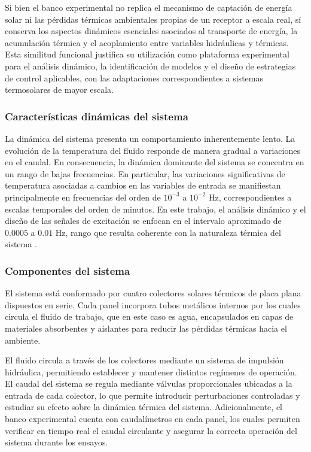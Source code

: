 \documentclass[11pt]{report}
\begin{document}
Si bien el banco experimental no replica el mecanismo de captación de energía solar ni las pérdidas térmicas ambientales propias de un receptor a escala real, sí conserva los aspectos dinámicos esenciales asociados al transporte de energía, la acumulación térmica y el acoplamiento entre variables hidráulicas y térmicas. Esta similitud funcional justifica su utilización como plataforma experimental para el análisis dinámico, la identificación de modelos y el diseño de estrategias de control aplicables,  con las adaptaciones correspondientes a sistemas termosolares de mayor escala.

 \subsubsection{Características dinámicas del sistema}

La dinámica del sistema presenta un comportamiento inherentemente lento. La evolución de la temperatura del fluido responde de manera gradual a variaciones en el caudal. En consecuencia, la dinámica dominante del sistema se concentra en un rango de bajas frecuencias. En particular, las variaciones significativas de temperatura asociadas a cambios en las variables de entrada se manifiestan principalmente en frecuencias del orden de $10^{-3}$ a $10^{-2}$ Hz, correspondientes a escalas temporales del orden de minutos. En este trabajo, el análisis dinámico y el diseño de las señales de excitación se enfocan en el intervalo aproximado de $0.0005$ a $0.01$ Hz, rango que resulta coherente con la naturaleza térmica del sistema \cite{pr8121607}.


\subsubsection{Componentes del sistema}

El sistema está conformado por cuatro colectores solares térmicos de placa plana dispuestos en serie. Cada panel incorpora tubos metálicos internos por los cuales circula el fluido de trabajo, que en este caso es agua, encapsulados en capas de materiales absorbentes y aislantes para reducir las pérdidas térmicas hacia el ambiente.


El fluido circula a través de los colectores mediante un sistema de impulsión hidráulica, permitiendo establecer y mantener distintos regímenes de operación. El caudal del sistema se regula mediante válvulas proporcionales ubicadas a la entrada de cada colector, lo que permite introducir perturbaciones controladas y estudiar su efecto sobre la dinámica térmica del sistema. Adicionalmente, el banco experimental cuenta con caudalímetros en cada panel, los cuales permiten verificar en tiempo real el caudal circulante y asegurar la correcta operación del sistema durante los ensayos.
\end{document}

